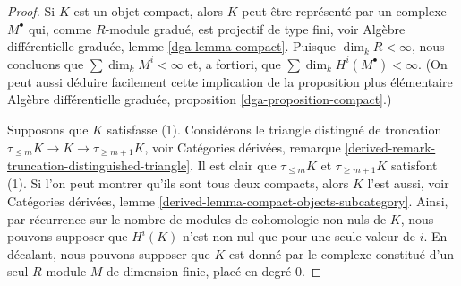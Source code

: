 \begin{proof}
Si $K$ est un objet compact, alors $K$ peut être représenté par un complexe
$M^\bullet$ qui, comme $R$-module gradué, est projectif de type fini, voir
Algèbre différentielle graduée, lemme \ref{dga-lemma-compact}.
Puisque $\dim_k R < \infty$, nous concluons que $\sum \dim_k M^i < \infty$
et, a fortiori, que $\sum \dim_k H^i(M^\bullet) < \infty$.
(On peut aussi déduire facilement cette implication de la proposition plus élémentaire
Algèbre différentielle graduée, proposition \ref{dga-proposition-compact}.)

\medskip\noindent
Supposons que $K$ satisfasse (1). Considérons le triangle distingué
de troncation $\tau_{\leq m}K \to K \to \tau_{\geq m + 1}K$, voir
Catégories dérivées, remarque
\ref{derived-remark-truncation-distinguished-triangle}.
Il est clair que $\tau_{\leq m}K$ et $\tau_{\geq m + 1} K$
satisfont (1). Si l'on peut montrer qu'ils sont tous deux compacts, alors $K$ l'est aussi, voir
Catégories dérivées, lemme \ref{derived-lemma-compact-objects-subcategory}.
Ainsi, par récurrence sur le nombre de modules de cohomologie non nuls de $K$,
nous pouvons supposer que $H^i(K)$ n'est non nul que pour une seule valeur de $i$.
En décalant, nous pouvons supposer que $K$ est donné par le complexe
constitué d'un seul $R$-module $M$ de dimension finie, placé
en degré $0$.


\end{proof}
